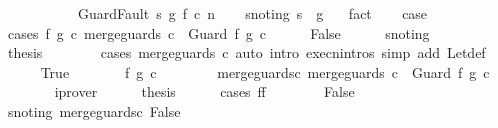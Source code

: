 \begin{isabellebody}
\ \ \ \ \isamarkupfalse%
\isanewline
\ \ \isamarkupfalse%
\isanewline
{}\isamarkupfalse%
\isanewline
\ \ \isamarkupfalse%
\ {\isacharparenleft}GuardFault\ s\ g\ f\ c\ n{\isacharparenright}\isanewline
\ \ \isamarkupfalse%
\ s{\isacharunderscore}notin{\isacharunderscore}g{\isacharcolon}\ {\isachardoublequoteopen}s\ {\isasymnotin}\ g{\isachardoublequoteclose}\ \ \isamarkupfalse%
\ fact\isanewline
\ \ \isamarkupfalse%
\ {\isacharquery}case\isanewline
\ \ \isamarkupfalse%
\ {\isacharparenleft}cases\ {\isachardoublequoteopen}{\isasymexists}f{\isacharprime}\ g{\isacharprime}\ c{\isacharprime}{\isachardot}\ merge{\isacharunderscore}guards\ c\ {\isacharequal}\ Guard\ f{\isacharprime}\ g{\isacharprime}\ c{\isacharprime}{\isachardoublequoteclose}{\isacharparenright}\isanewline
\ \ \ \ \isamarkupfalse%
\ False\isanewline
\ \ \ \ \isamarkupfalse%
\ s{\isacharunderscore}notin{\isacharunderscore}g\isanewline
\ \ \ \ \isamarkupfalse%
\ {\isacharquery}thesis\isanewline
\ \ \ \ \ \ \isamarkupfalse%
\ {\isacharparenleft}cases\ {\isachardoublequoteopen}merge{\isacharunderscore}guards\ c{\isachardoublequoteclose}{\isacharparenright}\ {\isacharparenleft}auto\ intro{\isacharcolon}\ execn{\isachardot}intros\ simp\ add{\isacharcolon}\ Let{\isacharunderscore}def{\isacharparenright}\isanewline
\ \ \isamarkupfalse%
\isanewline
\ \ \ \ \isamarkupfalse%
\ True\isanewline
\ \ \ \ \isamarkupfalse%
\ \isamarkupfalse%
\ f{\isacharprime}\ g{\isacharprime}\ c{\isacharprime}\ \ \isanewline
\ \ \ \ \ \ merge{\isacharunderscore}guards{\isacharunderscore}c{\isacharcolon}\ {\isachardoublequoteopen}merge{\isacharunderscore}guards\ c\ {\isacharequal}\ Guard\ f{\isacharprime}\ g{\isacharprime}\ c{\isacharprime}{\isachardoublequoteclose}\isanewline
\ \ \ \ \ \ \isamarkupfalse%
\ iprover\isanewline
\ \ \ \ \isamarkupfalse%
\ {\isacharquery}thesis\isanewline
\ \ \ \ \isamarkupfalse%
\ {\isacharparenleft}cases\ {\isachardoublequoteopen}f{\isacharequal}f{\isacharprime}{\isachardoublequoteclose}{\isacharparenright}\isanewline
\ \ \ \ \ \ \isamarkupfalse%
\ False\isanewline
\ \ \ \ \ \ \isamarkupfalse%
\ s{\isacharunderscore}notin{\isacharunderscore}g\ merge{\isacharunderscore}guards{\isacharunderscore}c\ False\ \isamarkupfalse%

\end{isabellebody}
